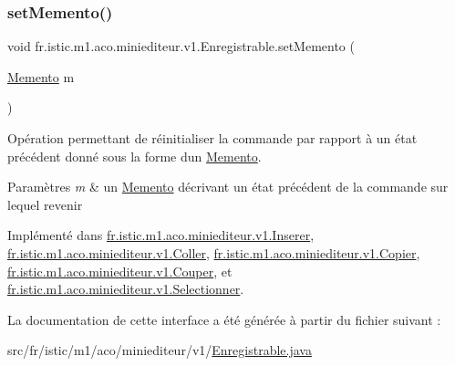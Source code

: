 \subsubsection{\texorpdfstring{set\+Memento()}{setMemento()}}
{\footnotesize\ttfamily void fr.\+istic.\+m1.\+aco.\+miniediteur.\+v1.\+Enregistrable.\+set\+Memento (\begin{DoxyParamCaption}\item[{\hyperlink{interfacefr_1_1istic_1_1m1_1_1aco_1_1miniediteur_1_1v1_1_1Memento}{Memento}}]{m }\end{DoxyParamCaption})}



Opération permettant de réinitialiser la commande par rapport à un état précédent donné sous la forme d\textquotesingle{}un \hyperlink{interfacefr_1_1istic_1_1m1_1_1aco_1_1miniediteur_1_1v1_1_1Memento}{Memento}. 


\begin{DoxyParams}{Paramètres}
{\em m} & un \hyperlink{interfacefr_1_1istic_1_1m1_1_1aco_1_1miniediteur_1_1v1_1_1Memento}{Memento} décrivant un état précédent de la commande sur lequel revenir \\
\hline
\end{DoxyParams}


Implémenté dans \hyperlink{classfr_1_1istic_1_1m1_1_1aco_1_1miniediteur_1_1v1_1_1Inserer_a1978002e0aa031a5293ff3263c49fe94}{fr.\+istic.\+m1.\+aco.\+miniediteur.\+v1.\+Inserer}, \hyperlink{classfr_1_1istic_1_1m1_1_1aco_1_1miniediteur_1_1v1_1_1Coller_ae124aa0dd82f636e21afa91b01838edc}{fr.\+istic.\+m1.\+aco.\+miniediteur.\+v1.\+Coller}, \hyperlink{classfr_1_1istic_1_1m1_1_1aco_1_1miniediteur_1_1v1_1_1Copier_a4e1de8f07ded1ed4e33d8c8e6385a0a6}{fr.\+istic.\+m1.\+aco.\+miniediteur.\+v1.\+Copier}, \hyperlink{classfr_1_1istic_1_1m1_1_1aco_1_1miniediteur_1_1v1_1_1Couper_a36f0578188f4526c624565c9afa4abc8}{fr.\+istic.\+m1.\+aco.\+miniediteur.\+v1.\+Couper}, et \hyperlink{classfr_1_1istic_1_1m1_1_1aco_1_1miniediteur_1_1v1_1_1Selectionner_a80d7d18546f239290919a9e602405ffd}{fr.\+istic.\+m1.\+aco.\+miniediteur.\+v1.\+Selectionner}.



La documentation de cette interface a été générée à partir du fichier suivant \+:\begin{DoxyCompactItemize}
\item 
src/fr/istic/m1/aco/miniediteur/v1/\hyperlink{Enregistrable_8java}{Enregistrable.\+java}\end{DoxyCompactItemize}
